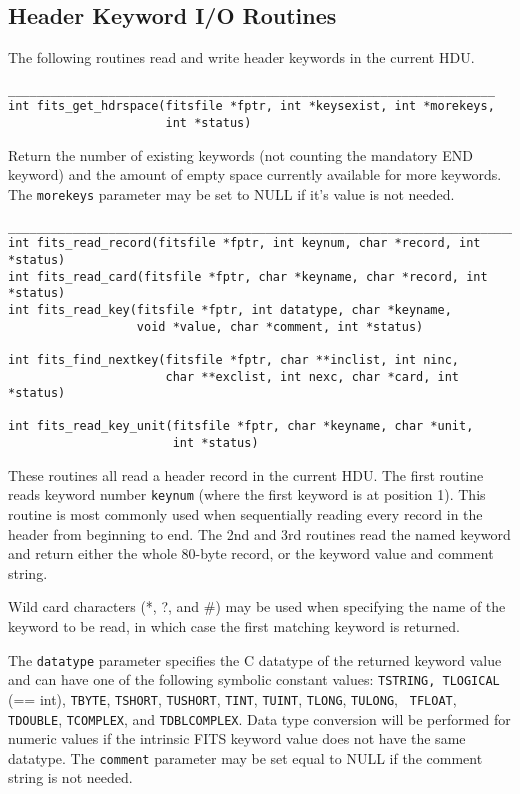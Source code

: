 \documentclass[11pt]{article}
\begin{document}
\newpage
\subsection{Header Keyword I/O Routines}
\nopagebreak
The following routines read and write header keywords in the current HDU.
\nopagebreak

\begin{verbatim}
____________________________________________________________________
int fits_get_hdrspace(fitsfile *fptr, int *keysexist, int *morekeys,
                      int *status)
\end{verbatim}
\nopagebreak
Return the number of existing keywords (not counting the mandatory END
keyword) and the amount of empty space currently available for more
keywords. The {\tt morekeys} parameter may be set to NULL if it's value is
not needed.

\begin{verbatim}
___________________________________________________________________________
int fits_read_record(fitsfile *fptr, int keynum, char *record, int *status)
int fits_read_card(fitsfile *fptr, char *keyname, char *record, int *status)
int fits_read_key(fitsfile *fptr, int datatype, char *keyname,
                  void *value, char *comment, int *status)

int fits_find_nextkey(fitsfile *fptr, char **inclist, int ninc,
                      char **exclist, int nexc, char *card, int *status)

int fits_read_key_unit(fitsfile *fptr, char *keyname, char *unit, 
                       int *status)
\end{verbatim}

These routines all read a header record in the current HDU. The first
routine reads keyword number {\tt keynum} (where the first keyword is
at position 1).  This routine is most commonly used when sequentially
reading every record in the header from beginning to end.  The 2nd and
3rd routines read the named keyword and return either the whole
80-byte record, or the keyword value and comment string.

Wild card characters (*, ?, and \#) may be used when specifying the name
of the keyword to be read, in which case the first matching keyword is
returned.

The {\tt datatype} parameter specifies the C datatype of the returned
keyword value and can have one of the following symbolic constant
values:  {\tt TSTRING, TLOGICAL} (== int), {\tt TBYTE}, {\tt TSHORT},
{\tt TUSHORT}, {\tt TINT}, {\tt TUINT}, {\tt TLONG}, {\tt TULONG}, {\tt
TFLOAT}, {\tt TDOUBLE}, {\tt TCOMPLEX}, and {\tt TDBLCOMPLEX}.  Data
type conversion will be performed for numeric values if the intrinsic
FITS keyword value does not have the same datatype.  The {\tt comment}
parameter may be set equal to NULL if the comment string is not
needed.
\end{document}

